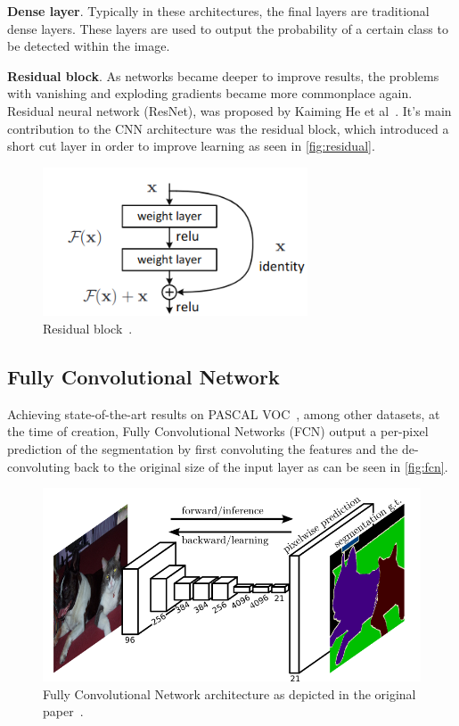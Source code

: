 \documentclass[oneside, english, bibtex]{kththesis}
\begin{document}
\textbf{Dense layer}. Typically in these architectures, the final layers are traditional dense layers. These layers are used to output the probability of a certain class to be detected within the image.

\textbf{Residual block}. As networks became deeper to improve results, the problems with vanishing and exploding gradients became more commonplace again. Residual neural network (ResNet), was proposed by Kaiming He et al~\cite{he2016deep}. It’s main contribution to the CNN architecture was the residual block, which introduced a short cut layer in order to improve learning as seen in \autoref{fig:residual}.

\begin{figure}[H]
  \begin{center}
    \includegraphics[width=0.7\textwidth]{figures/residual_block.png}
  \end{center}
  \caption{Residual block~\cite{he2016deep}.}
  \label{fig:residual}
\end{figure}

\subsection{Fully Convolutional Network}

Achieving state-of-the-art results on PASCAL VOC~\cite{DBLP:journals/corr/LongSD14}, among other datasets, at the time of creation, Fully Convolutional Networks (FCN) output a per-pixel prediction of the segmentation by first convoluting the features and the de-convoluting back to the original size of the input layer as can be seen in \autoref{fig:fcn}.

\begin{figure}[H]
  \begin{center}
    \includegraphics[width=1.0\textwidth]{figures/fcn.png}
  \end{center}
  \caption{Fully Convolutional Network architecture as depicted in the original paper~\cite{DBLP:journals/corr/LongSD14}.}
  \label{fig:fcn}
\end{figure}
\end{document}
